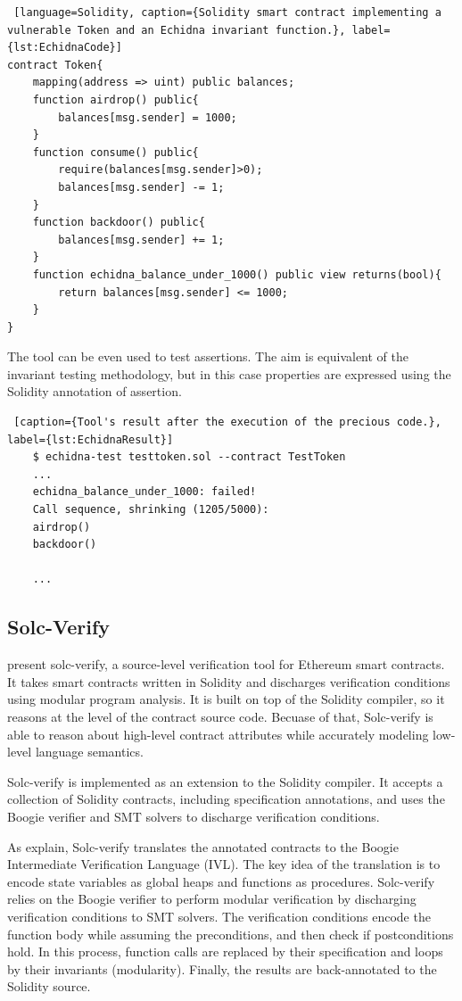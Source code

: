 \begin{lstlisting} [language=Solidity, caption={Solidity smart contract implementing a vulnerable Token and an Echidna invariant function.}, label={lst:EchidnaCode}]
contract Token{
    mapping(address => uint) public balances;
    function airdrop() public{
        balances[msg.sender] = 1000;
    }
    function consume() public{
        require(balances[msg.sender]>0);
        balances[msg.sender] -= 1;
    }
    function backdoor() public{
        balances[msg.sender] += 1;
    }
    function echidna_balance_under_1000() public view returns(bool){
        return balances[msg.sender] <= 1000;
    }
}
\end{lstlisting}

The tool can be even used to test assertions. 
The aim is equivalent of the invariant testing methodology, 
but in this case properties are expressed using the Solidity annotation of assertion.

\begin{lstlisting} [caption={Tool's result after the execution of the precious code.}, label={lst:EchidnaResult}]
    $ echidna-test testtoken.sol --contract TestToken
    ...
    echidna_balance_under_1000: failed!
    Call sequence, shrinking (1205/5000):
    airdrop()
    backdoor()

    ...
\end{lstlisting}


\subsection{Solc-Verify}
\label{sec:Specification:Solc-Verify}

\citet{SolcVerify} present solc-verify, a source-level verification tool for
Ethereum smart contracts. It takes smart contracts written
in Solidity and discharges verification conditions using modular program
analysis. It is built on top of the Solidity compiler, so it reasons at the level of the contract source code. 
Becuase of that, Solc-verify is able to reason about high-level contract attributes 
while accurately modeling low-level language semantics.

Solc-verify is implemented as an extension to the Solidity compiler.
It accepts a collection of Solidity contracts, including specification annotations, and uses 
the Boogie verifier and SMT solvers to discharge verification conditions. 

As \citet{SolcVerify_2} explain, Solc-verify translates the annotated contracts to the Boogie Intermediate Verification
Language (IVL). The key idea of the translation is to encode state variables as global heaps
and functions as procedures. Solc-verify relies on the Boogie verifier to perform modular
verification by discharging verification conditions to SMT solvers. The verification conditions
encode the function body while assuming the preconditions, and then check if postconditions
hold. In this process, function calls are replaced by their specification and loops by their
invariants (modularity). Finally, the results are back-annotated to the Solidity source.

